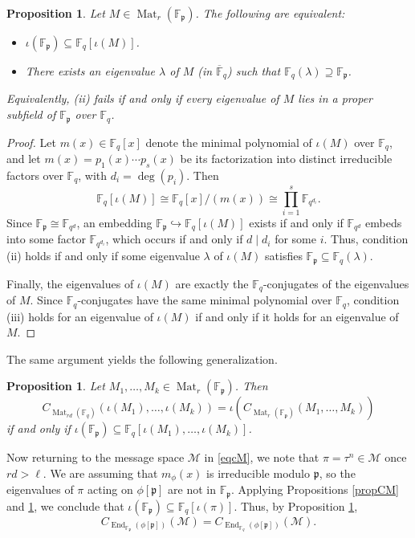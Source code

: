 \documentclass[12pt]{amsart}
\newtheorem{prop}[thm]{Proposition}
\theoremstyle{definition}
\theoremstyle{remark}
\numberwithin{equation}{section}
\numberwithin{thm}{section}
\DeclareMathOperator{\End}{End}
\DeclareMathOperator{\Mat}{Mat}
\newcommand{\fp}{\mathfrak{p}}
\newcommand{\cM}{\mathcal{M}}
\newcommand{\F}{\mathbb{F}}
\newcommand{\oF}{\overline{\F}}
\newcommand{\la}{\lambda}
\begin{document}
\begin{prop}\label{propCM2}
	Let $M\in \Mat_r(\F_\fp)$. The following are equivalent:
	\begin{itemize}
		\item[(ii)]  $\iota(\F_\fp)\subseteq \F_q[\iota(M)]$. 
		\item[(iii)] There exists an eigenvalue $\la$ of $M$ (in $\oF_q$) such that $\F_q(\la)\supseteq \F_\fp$. 
	\end{itemize}
	Equivalently, (ii) fails if and only if every eigenvalue of $M$ lies in a proper subfield of $\F_\fp$ over $\F_q$. 
\end{prop}
\begin{proof}
	Let $m(x)\in \F_q[x]$ denote the minimal polynomial of $\iota(M)$ over $\F_q$, and let $m(x)=p_1(x)\cdots p_s(x)$ 
	be its factorization into distinct irreducible factors over $\F_q$, with $d_i=\deg(p_i)$. Then 
	\[
	\F_q[\iota(M)]\cong \F_q[x]/(m(x)) \cong \prod_{i=1}^s \F_{q^{d_i}}. 
	\]
	Since $\F_\fp\cong \F_{q^d}$, an embedding $\F_\fp\hookrightarrow \F_q[\iota(M)]$ exists if and only if $\F_{q^d}$ 
	embeds into some factor $\F_{q^{d_i}}$, which occurs if and only if $d\mid d_i$ for some $i$.  Thus, condition (ii) holds if and only if 
	some eigenvalue $\la$ of $\iota(M)$ satisfies $\F_\fp\subseteq \F_q(\la)$. 
	
	Finally, the eigenvalues of $\iota(M)$ are exactly the $\F_q$-conjugates of the eigenvalues of $M$. Since $\F_q$-conjugates 
	have the same minimal polynomial over $\F_q$, condition (iii) holds for an eigenvalue of $\iota(M)$ if and only if it holds 
	for an eigenvalue of $M$. 
\end{proof}

The same argument yields the following generalization.

\begin{prop}\label{propCM3}
	Let $M_1, \dots, M_k\in \Mat_r(\F_\fp)$. Then 
	\[
	C_{\Mat_{rd}(\F_q)}(\iota(M_1), \dots, \iota(M_k)) = \iota\left(C_{\Mat_r(\F_\fp)}(M_1, \dots, M_k)\right)
	\]
	if and only if $\iota(\F_\fp)\subseteq \F_q[\iota(M_1),\dots, \iota(M_k)]$. 
\end{prop}

Now returning to the message space $\cM$ in \eqref{eqcM}, we note that $\pi=\tau^n\in \cM$ once $rd>\ell$.  
We are assuming that $m_\phi(x)$ is irreducible modulo $\fp$, so the eigenvalues of $\pi$ acting on $\phi[\fp]$ 
are not in $\F_\fp$. Applying Propositions \ref{propCM} and \ref{propCM2}, we conclude that $\iota(\F_\fp)\subseteq \F_q[\iota(\pi)]$. 
Thus, by Proposition \ref{propCM3}, 
\[
C_{\End_{\F_\fp}(\phi[\fp])}(\cM) = C_{\End_{\F_q}(\phi[\fp])}(\cM).  
\]













\end{document}
